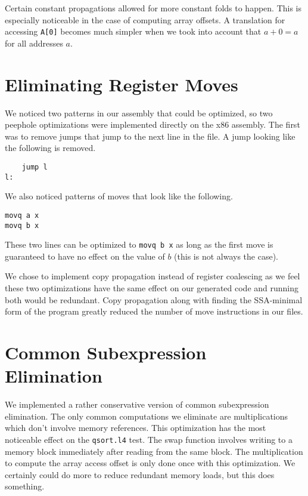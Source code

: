 \documentclass[aps,letterpaper,11pt]{revtex4}
\begin{document}
Certain constant propagations allowed for more constant folds to happen. This is especially noticeable in the
case of computing array offsets. A translation for accessing \texttt{A[0]} becomes much simpler when we took 
into account that $a+0 = a$ for all addresses $a$.

\section{Eliminating Register Moves}

We noticed two patterns in our assembly that could be optimized, so two peephole optimizations were implemented
directly on the x86 assembly. The first was to remove jumps that jump to the next line in the file. A jump
looking like the following is removed.

\begin{verbatim}
    jump l
l:
\end{verbatim}

We also noticed patterns of moves that look like the following.

\begin{verbatim}
movq a x
movq b x
\end{verbatim}

These two lines can be optimized to \texttt{movq b x} as long as the first move is guaranteed to have no effect
on the value of $b$ (this is not always the case).

We chose to implement copy propagation instead of register coalescing as we feel these two optimizations have
the same effect on our generated code and running both would be redundant. Copy propagation along with finding
the SSA-minimal form of the program greatly reduced the number of move instructions in our files.

\section{Common Subexpression Elimination}
We implemented a rather conservative version of common subexpression elimination. The only common computations
we eliminate are multiplications which don't involve memory references. This optimization has the most noticeable
effect on the \texttt{qsort.l4} test. The swap function involves writing to a memory block immediately after
reading from the same block. The multiplication to compute the array access offset is only done once with this
optimization. We certainly could do more to reduce redundant memory loads, but this does something.
\end{document}
